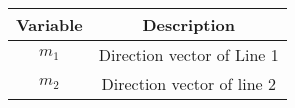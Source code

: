 \begin{tabular}[12pt]{ |c| c|}
    \hline
    \textbf{Variable} & \textbf{Description}\\ 
    \hline
    $m_1$ & Direction vector of Line 1 \\
    \hline 
    $m_2$ & Direction vector of line 2\\
    \hline   
    \end{tabular}
